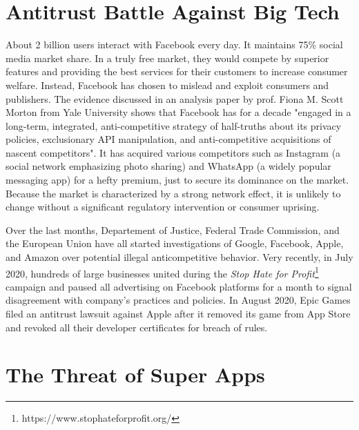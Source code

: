 \section{Antitrust Battle Against Big Tech}

About 2 billion users interact with Facebook every day. It maintains 75\% social media market share. In a truly free market, they would compete by superior features and providing the best services for their customers to increase consumer welfare. Instead, Facebook has chosen to mislead and exploit consumers and publishers. The evidence discussed in an analysis paper by prof. Fiona M. Scott Morton from Yale University \cite{antitrust} shows that Facebook has for a decade "engaged in a long-term,
integrated, anti-competitive strategy of half-truths about its privacy policies, exclusionary API manipulation, and anti-competitive acquisitions of nascent competitors". It has acquired various competitors such as Instagram (a social network emphasizing photo sharing) and WhatsApp (a widely popular messaging app) for a hefty premium, just to secure its dominance on the market. Because the market is characterized by a strong network effect, it is unlikely to change without a significant regulatory intervention or consumer uprising.

Over the last months, Departement of Justice, Federal Trade Commission, and the European Union have all started investigations of Google, Facebook, Apple, and Amazon over potential illegal anticompetitive behavior. Very recently, in July 2020, hundreds of large businesses united during the \textit{Stop Hate for Profit}\footnote{https://www.stophateforprofit.org/} campaign and paused all advertising on Facebook platforms for a month to signal disagreement with company's practices and policies. In August 2020, Epic Games filed an antitrust lawsuit \cite{fortnite} against Apple after it removed its game from App Store and revoked all their developer certificates for breach of rules.

\section{The Threat of Super Apps}

